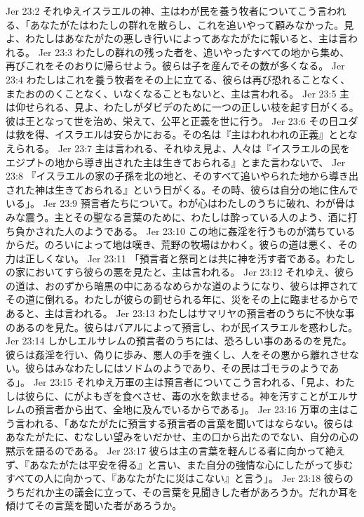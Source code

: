 Jer 23:2  それゆえイスラエルの神、主はわが民を養う牧者についてこう言われる、「あなたがたはわたしの群れを散らし、これを追いやって顧みなかった。見よ、わたしはあなたがたの悪しき行いによってあなたがたに報いると、主は言われる。
Jer 23:3  わたしの群れの残った者を、追いやったすべての地から集め、再びこれをそのおりに帰らせよう。彼らは子を産んでその数が多くなる。
Jer 23:4  わたしはこれを養う牧者をその上に立てる、彼らは再び恐れることなく、またおののくことなく、いなくなることもないと、主は言われる。
Jer 23:5  主は仰せられる、見よ、わたしがダビデのために一つの正しい枝を起す日がくる。彼は王となって世を治め、栄えて、公平と正義を世に行う。
Jer 23:6  その日ユダは救を得、イスラエルは安らかにおる。その名は『主はわれわれの正義』ととなえられる。
Jer 23:7  主は言われる、それゆえ見よ、人々は『イスラエルの民をエジプトの地から導き出された主は生きておられる』とまた言わないで、
Jer 23:8  『イスラエルの家の子孫を北の地と、そのすべて追いやられた地から導き出された神は生きておられる』という日がくる。その時、彼らは自分の地に住んでいる」。
Jer 23:9  預言者たちについて。わが心はわたしのうちに破れ、わが骨はみな震う。主とその聖なる言葉のために、わたしは酔っている人のよう、酒に打ち負かされた人のようである。
Jer 23:10  この地に姦淫を行うものが満ちているからだ。のろいによって地は嘆き、荒野の牧場はかわく。彼らの道は悪く、その力は正しくない。
Jer 23:11  「預言者と祭司とは共に神を汚す者である。わたしの家においてすら彼らの悪を見たと、主は言われる。
Jer 23:12  それゆえ、彼らの道は、おのずから暗黒の中にあるなめらかな道のようになり、彼らは押されてその道に倒れる。わたしが彼らの罰せられる年に、災をその上に臨ませるからであると、主は言われる。
Jer 23:13  わたしはサマリヤの預言者のうちに不快な事のあるのを見た。彼らはバアルによって預言し、わが民イスラエルを惑わした。
Jer 23:14  しかしエルサレムの預言者のうちには、恐ろしい事のあるのを見た。彼らは姦淫を行い、偽りに歩み、悪人の手を強くし、人をその悪から離れさせない。彼らはみなわたしにはソドムのようであり、その民はゴモラのようである」。
Jer 23:15  それゆえ万軍の主は預言者についてこう言われる、「見よ、わたしは彼らに、にがよもぎを食べさせ、毒の水を飲ませる。神を汚すことがエルサレムの預言者から出て、全地に及んでいるからである」。
Jer 23:16  万軍の主はこう言われる、「あなたがたに預言する預言者の言葉を聞いてはならない。彼らはあなたがたに、むなしい望みをいだかせ、主の口から出たのでない、自分の心の黙示を語るのである。
Jer 23:17  彼らは主の言葉を軽んじる者に向かって絶えず、『あなたがたは平安を得る』と言い、また自分の強情な心にしたがって歩むすべての人に向かって、『あなたがたに災はこない』と言う」。
Jer 23:18  彼らのうちだれか主の議会に立って、その言葉を見聞きした者があろうか。だれか耳を傾けてその言葉を聞いた者があろうか。
